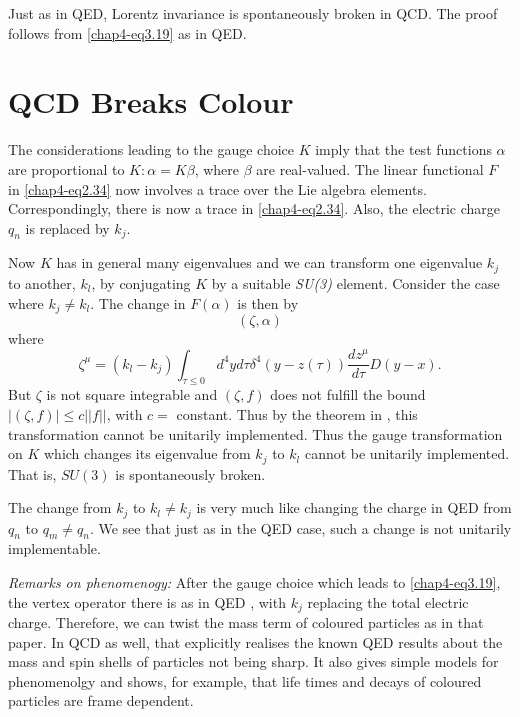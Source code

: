 Just as in QED, Lorentz invariance is spontaneously broken in QCD. The proof follows from \eqref{chap4-eq3.19} as in QED.

\section{QCD Breaks Colour}\label{chap4-sec4}

The considerations leading to the gauge choice $K$ imply that the test functions $\alpha$ are proportional to $K: \alpha = K \beta$, where $\beta$ are real-valued. The linear functional $F$ in \eqref{chap4-eq2.34} now involves a trace over the Lie algebra elements. Correspondingly, there is now a trace in \eqref{chap4-eq2.34}. Also, the electric charge $q_n$ is replaced by $k_j$.

Now $K$ has in general many eigenvalues and we can transform one eigenvalue $k_j$ to another, $k_l$, by conjugating $K$ by a suitable \textit{SU(3)} element. Consider the case where $k_j \neq k_l$. The change in $F(\alpha)$ is then by
\begin{equation}
(\zeta, \alpha) \label{chap4-eq4.1}
\end{equation}
where
\begin{equation}
  \zeta^\mu = (k_l - k_j) \int_{\tau \leq 0} d^4 y d\tau \delta^4 (y -z(\tau)) \frac{dz^\mu}{d \tau} D (y-x). \label{chap4-eq4.2}
\end{equation}
But $\zeta$ is not square integrable and $(\zeta, f)$ does not fulfill the bound\break $|(\zeta, f)|\leq c || f ||$, with $c=$ constant. Thus by the theorem in \cite{chap4-key6}, this transformation cannot be unitarily implemented. Thus the gauge transformation on $K$ which changes its eigenvalue from $k_j$ to $k_l$ cannot be unitarily implemented. That is, $S\!U(3)$ is spontaneously broken.

The change from $k_j$ to $k_l \neq k_j$ is very much like changing the charge in QED from $q_n$ to $q_m \neq q_n$. We see that just as in the QED case, such a change is not unitarily implementable.

\textit{Remarks on phenomenogy:} After the gauge choice which leads to \eqref{chap4-eq3.19}, the vertex operator there is as in QED \cite{chap4-key4}, with $k_j$ replacing the total electric charge. Therefore, we can twist the mass term of coloured particles as in that paper. In QCD as well, that explicitly realises the known QED results \cite{chap4-key2, chap4-key3} about the mass and spin shells of particles not being sharp. It also gives simple models for phenomenolgy and shows, for example, that life times and decays of coloured particles are frame dependent.

